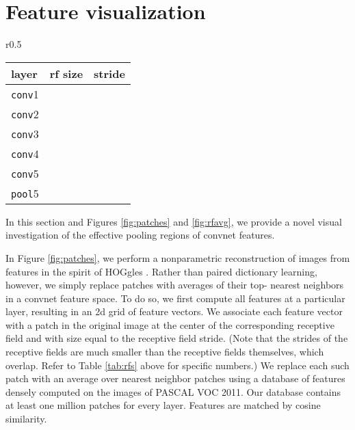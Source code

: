\documentclass{article} \usepackage{nips14submit_e,times}
\begin{document}
\section{Feature visualization}

\begin{wraptable}{r}{0.5\textwidth}
    \centering
    \small
    \caption{Convnet receptive field sizes and strides, for an input of size
    . }
    \begin{tabular}{lll}
        layer & rf size & stride \\
        \hline
        \texttt{conv}1 &  &  \\
        \texttt{conv}2 &  &  \\
        \texttt{conv}3 &  &  \\
        \texttt{conv}4 &  &  \\
        \texttt{conv}5 &  &  \\
        \texttt{pool}5 &  & 
    \end{tabular}
    \label{tab:rfs}
\end{wraptable}

In this section and Figures \ref{fig:patches} and \ref{fig:rfavg}, we provide a
novel visual investigation of the effective pooling regions of convnet features.

In Figure \ref{fig:patches}, we perform a nonparametric reconstruction of images
from features in the spirit of HOGgles \cite{hoggles}.
Rather than paired dictionary learning, however, we simply replace patches with
averages of their top- nearest neighbors in a convnet feature space.
To do so, we first compute all features at a particular layer, resulting in an
2d grid of feature vectors.
We associate each feature vector with a patch in the original image at the
center of the corresponding receptive field and with size equal to the receptive
field stride.
(Note that the strides of the receptive fields are much smaller than the
receptive fields themselves, which overlap.
Refer to Table \ref{tab:rfs} above for specific numbers.)
We replace each such patch with an average over  nearest neighbor patches
using a database of features densely computed on the images of PASCAL VOC 2011.
Our database contains at least one million patches for every layer.
Features are matched by cosine similarity.
\end{document}
